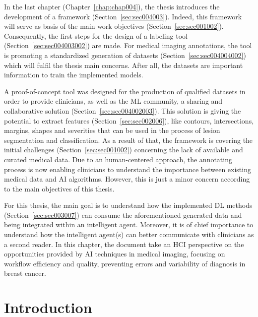 \clearpage
\label{chap:chap005}

In the last chapter (Chapter~\ref{chap:chap004}), the thesis introduces the development of a framework (Section~\ref{sec:sec004003}).
Indeed, this framework will serve as basis of the main work objectives (Section~\ref{sec:sec001002}).
Consequently, the first steps for the design of a labeling tool (Section~\ref{sec:sec004003002}) are made.
For medical imaging annotations, the tool is promoting a standardized generation of datasets (Section~\ref{sec:sec004004002}) which will fulfil the thesis main concerns.
After all, the datasets are important information to train the implemented models.

A proof-of-concept tool was designed for the production of qualified datasets in order to provide clinicians, as well as the \ac{ML} community, a sharing and collaborative solution (Section~\ref{sec:sec004002003}).
This solution is giving the potential to extract features (Section~\ref{sec:sec002006}), like contours, intersections, margins, shapes and severities that can be used in the process of lesion segmentation and classification.
As a result of that, the framework is covering the initial challenges (Section~\ref{sec:sec001002}) concerning the lack of available and curated medical data.
Due to an human-centered approach, the annotating process is now enabling clinicians to understand the importance between existing medical data and \ac{AI} algorithms.
However, this is just a minor concern according to the main objectives of this thesis.

For this thesis, the main goal is to understand how the implemented \ac{DL} methods (Section~\ref{sec:sec003007}) can consume the aforementioned generated data and being integrated within an intelligent agent.
Moreover, it is of chief importance to understand how the intelligent agent(s) can better communicate with clinicians as a second reader.
In this chapter, the document take an \ac{HCI} perspective on the opportunities provided by \ac{AI} techniques in medical imaging, focusing on workflow efficiency and quality, preventing errors and variability of diagnosis in breast cancer.

\section{Introduction}
\label{sec:sec005001}

